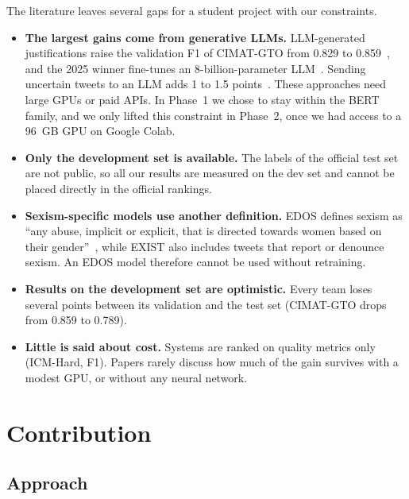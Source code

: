 \documentclass[pdflatex,sn-mathphys-num]{sn-jnl}
\begin{document}
The literature leaves several gaps for a student project with our constraints.
\begin{itemize}
\item \textbf{The largest gains come from generative LLMs.} LLM-generated justifications raise the validation F1 of CIMAT-GTO from 0.829 to 0.859~\cite{cimat2024stacked}, and the 2025 winner fine-tunes an 8-billion-parameter LLM~\cite{mario2025}. Sending uncertain tweets to an LLM adds 1 to 1.5 points~\cite{alajmi2025warwick}. These approaches need large GPUs or paid APIs. In Phase~1 we chose to stay within the BERT family, and we only lifted this constraint in Phase~2, once we had access to a 96~GB GPU on Google Colab.
\item \textbf{Only the development set is available.} The labels of the official test set are not public, so all our results are measured on the dev set and cannot be placed directly in the official rankings.
\item \textbf{Sexism-specific models use another definition.} EDOS defines sexism as ``any abuse, implicit or explicit, that is directed towards women based on their gender''~\cite{kirk2023edos}, while EXIST also includes tweets that report or denounce sexism. An EDOS model therefore cannot be used without retraining.
\item \textbf{Results on the development set are optimistic.} Every team loses several points between its validation and the test set (CIMAT-GTO drops from 0.859 to 0.789).
\item \textbf{Little is said about cost.} Systems are ranked on quality metrics only (ICM-Hard, F1). Papers rarely discuss how much of the gain survives with a modest GPU, or without any neural network.
\end{itemize}

\section{Contribution}\label{sec:contrib}

\subsection{Approach}
\end{document}
